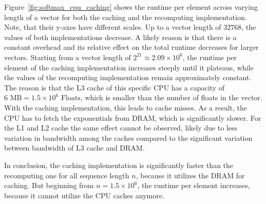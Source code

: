 \documentclass[conference]{IEEEtran}
\begin{document}
Figure~\ref{fig:softmax_cpu_caching} shows the runtime per element across varying length of a vector for both the caching and the recomputing implementation. Note, that their y-axes have different scales. Up to a vector length of \(32768\), the values of both implementations decrease. A likely reason is that there is a constant overhead and its relative effect on the total runtime decreases for larger vectors. Starting from a vector length of \( 2^{21} \approx 2.09 \times 10^6 \), the runtime per element of the caching implementation increases steeply until it plateaus, while the values of the recomputing implementation remain approximately constant. The reason is that the L3 cache of this specific CPU has a capacity of \(6 \text{ MB} = 1.5 \times 10^6 \text{ Floats}\), which is smaller than the number of floats in the vector. With the caching implementation, this leads to cache misses. As a result, the CPU has to fetch the exponentials from DRAM, which is significantly slower. For the L1 and L2 cache the same effect cannot be observed, likely due to less variation in bandwidth among the caches compared to the significant variation between bandwidth of L3 cache and DRAM. 

In conclusion, the caching implementation is significantly faster than the recomputing one for all sequence length \(n\), because it utilizes the DRAM for caching. But beginning from \(n = 1.5 \times 10^6\), the runtime per element increases, because it cannot utilize the CPU caches anymore.
\end{document}
